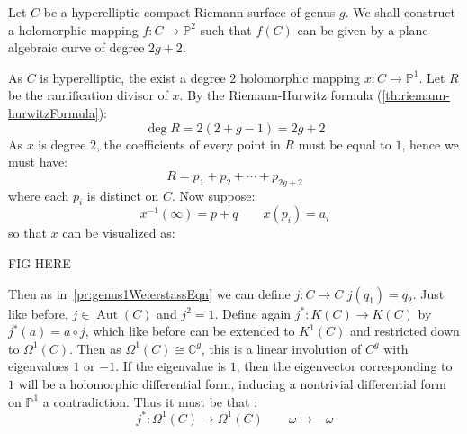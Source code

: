 \documentclass{book}
\newcommand{\C}{{\mathbb{C}}}
\renewcommand{\P}{{\mathbb{P}}}
\newcommand{\Aut}{{\operatorname{Aut}}}
\begin{document}
\begin{Proof}
  Let $C$ be a hyperelliptic compact Riemann surface of genus $g$. We shall construct a holomorphic mapping $f:
  C \to \P^2$ such that $f(C)$ can be given by a plane algebraic curve of degree $2g+2$.

  As $C$ is hyperelliptic, the exist a degree $2$ holomorphic mapping $x: C \to \P^1$. Let $R$ be the
  ramification divisor of $x$. By the Riemann-Hurwitz formula (\cref{th:riemann-hurwitzFormula}):
  \[
    \deg R = 2(2+g-1) = 2g+2
  \]
  As $x$ is degree $2$, the coefficients of every point in $R$ must be equal to $1$, hence we must have:
  \[
    R = p_1 + p_2 + \cdots + p_{2g+2}
  \]
  where each $p_i$ is distinct on $C$. Now suppose:
  \[
  x^{-1}(\infty) = p+q \qquad x(p_i) = a_i
  \]
  so that $x$ can be visualized as:
  \begin{center}
    FIG HERE
  \end{center}
  Then as in~\cref{pr:genus1WeierstassEqn} we can define $j: C \to C$ $j(q_1) = q_2$. Just like before, $j \in
  \Aut(C)$ and $j^2 = 1$. Define again $j^*: K(C) \to K(C)$ by $j^*(a) = a\circ j$, which like before can be
  extended to $K^1(C)$ and restricted down to $\Omega^1(C)$. Then as $\Omega^1(C) \cong \C^g$, this is
  a linear involution of $C^g$ with eigenvalues $1$ or $-1$. If the eigenvalue is $1$, then the eigenvector
  corresponding to $1$ will be a holomorphic differential form, inducing a nontrivial differential form on
  $\P^1$ a contradiction. Thus it must be that :
  \[
    j^*: \Omega^1(C) \to \Omega^1(C) \qquad \omega \mapsto -\omega
  \]


\end{Proof}
\end{document}
